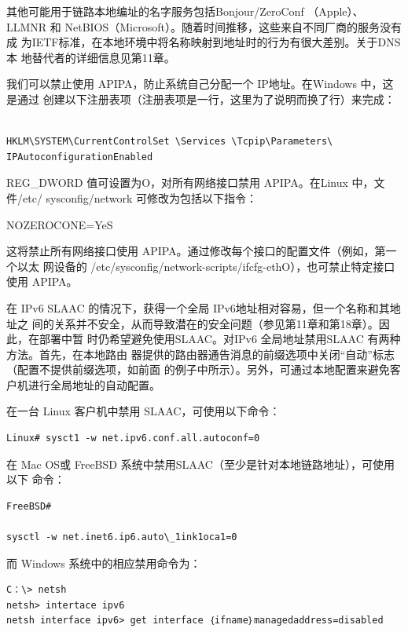 \begin{tcolorbox}
    其他可能用于链路本地编址的名字服务包括Bonjour/ZeroConf （Apple）、
    LLMNR 和 NetBIOS（Microsoft）。随着时间推移，这些来自不同厂商的服务没有成
    为IETF标准，在本地环境中将名称映射到地址时的行为有很大差别。关于DNS本
    地替代者的详细信息见第11章。
\end{tcolorbox}

我们可以禁止使用 APIPA，防止系统自己分配一个 IP地址。在Windows 中，这是通过
创建以下注册表项（注册表项是一行，这里为了说明而换了行）来完成：

\begin{verbatim}
    
HKLM\SYSTEM\CurrentControlSet \Services \Tcpip\Parameters\
IPAutoconfigurationEnabled
\end{verbatim}

REG\_DWORD 值可设置为O，对所有网络接口禁用 APIPA。在Linux 中，文件/etc/
sysconfig/network 可修改为包括以下指令：

NOZEROCONE=YeS

这将禁止所有网络接口使用 APIPA。通过修改每个接口的配置文件（例如，第一个以太
网设备的 /etc/sysconfig/network-scripts/ifcfg-ethO），也可禁止特定接口使用 APIPA。

在 IPv6 SLAAC 的情况下，获得一个全局 IPv6地址相对容易，但一个名称和其地址之
间的关系并不安全，从而导致潜在的安全问题（参见第11章和第18章）。因此，在部署中暂
时仍希望避免使用SLAAC。对IPv6 全局地址禁用SLAAC 有两种方法。首先，在本地路由
器提供的路由器通告消息的前缀选项中关闭“自动”标志（配置不提供前缀选项，如前面
的例子中所示）。另外，可通过本地配置来避免客户机进行全局地址的自动配置。

在一台 Linux 客户机中禁用 SLAAC，可使用以下命令：

\begin{verbatim}    
Linux# sysct1 -w net.ipv6.conf.all.autoconf=0
\end{verbatim}

在 Mac OS或 FreeBSD 系统中禁用SLAAC（至少是针对本地链路地址），可使用以下
命令：

\begin{verbatim}
FreeBSD#

sysctl -w net.inet6.ip6.auto\_1ink1oca1=0
\end{verbatim}
而 Windows 系统中的相应禁用命令为：

\begin{verbatim}
C：\> netsh
netsh> intertace ipv6
netsh interface ipv6> get interface ｛ifname｝managedaddress=disabled
\end{verbatim}


